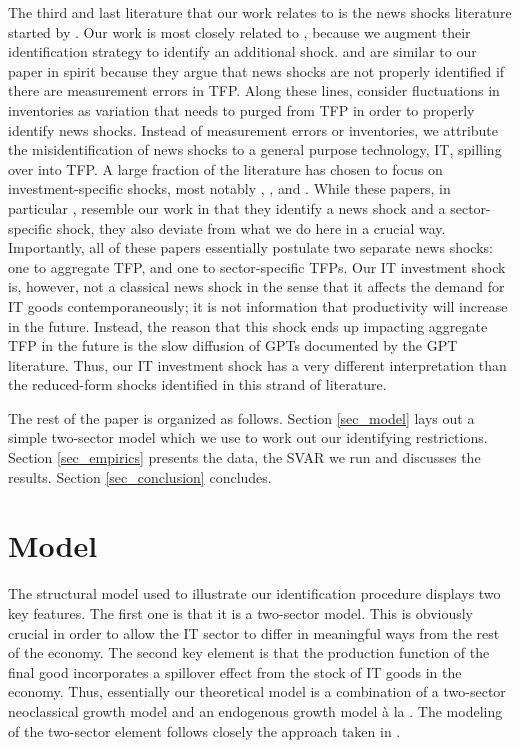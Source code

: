 \documentclass[11pt]{article}
\renewcommand{\[}{\begin{equation}}
\renewcommand{\]}{\end{equation}}
\begin{document}
The third and last literature that our work relates to is the news shocks literature started by  \cite{beaudry_portier2006}. Our work is most closely related to \cite{barsky_sims2011}, because we augment their identification strategy to identify an additional shock. \cite{bouakez_kemoe2017} and \cite{kurmann_sims2017} are similar to our paper in spirit because they argue that news shocks are not properly identified if there are measurement errors in TFP. Along these lines, \cite{crouzet_oh2016} consider fluctuations in inventories as variation that needs to purged from TFP in order to properly identify news shocks. Instead of measurement errors or inventories, we attribute the misidentification of news shocks to a general purpose technology, IT, spilling over into TFP.  A large fraction of the literature has chosen to focus on investment-specific shocks, most notably \cite{greenwood_etal1997}, \cite{fisher2006}, \cite{chen_wemy2015} and \cite{cummins_violante2002}. While these papers, in particular \cite{fisher2006}, resemble our work in that they identify a news shock and a sector-specific shock, they also deviate from what we do here in a crucial way. Importantly, all of these papers essentially postulate two separate news shocks: one to aggregate TFP, and one to sector-specific TFPs. Our IT investment shock is, however, not a classical news shock in the sense that it affects the demand for IT goods contemporaneously; it is not information that productivity will increase in the future. Instead, the reason that this shock ends up impacting aggregate TFP in the future is the slow diffusion of GPTs documented by the GPT literature. Thus, our IT investment shock has a very different interpretation than the reduced-form shocks identified in this strand of literature. 

The rest of the paper is organized as follows. Section \ref{sec_model} lays out a simple two-sector model which we use to work out our identifying restrictions. Section \ref{sec_empirics} presents the data, the SVAR we run and discusses the results. Section \ref{sec_conclusion} concludes. 



\section{Model}
The structural model used to illustrate our identification procedure displays two key features. The first one is that it is a two-sector model. This is obviously crucial in order to allow the IT sector to differ in meaningful ways from the rest of the economy. The second key element is that the production function of the final good incorporates a spillover effect from the stock of IT goods in the economy. Thus, essentially our theoretical model is a combination of a two-sector neoclassical growth model and an endogenous growth model \`a la \cite{romer1986}. The modeling of the two-sector element follows closely the approach taken in \cite{oulton2010}.
\end{document}

